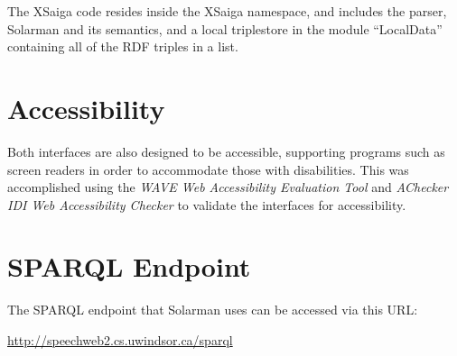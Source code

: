 \documentclass[../main.tex]{subfiles}
\begin{document}
The XSaiga code resides inside the XSaiga namespace, and includes the parser, Solarman and its semantics, and a local triplestore in the module ``LocalData'' containing
all of the RDF triples in a list.  

\section{Accessibility}

Both interfaces are also designed to be accessible, supporting programs such as screen readers in order to accommodate those with disabilities.
This was accomplished using the {\em WAVE Web Accessibility Evaluation Tool}\cite{wave} and {\em AChecker IDI Web Accessibility Checker}\cite{achecker} to validate the interfaces for accessibility.

\section{SPARQL Endpoint}
The SPARQL endpoint that Solarman uses can be accessed via this URL:

\url{http://speechweb2.cs.uwindsor.ca/sparql}
\end{document}

